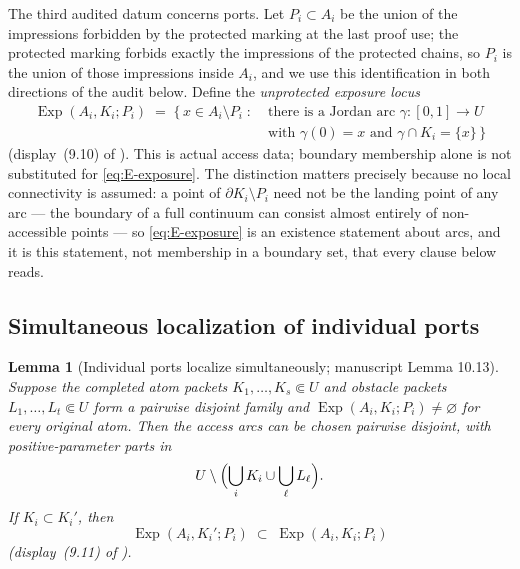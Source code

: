 \documentclass[11pt,reqno]{amsart}
\newtheorem{lemma}[theorem]{Lemma}
\theoremstyle{definition}
\theoremstyle{remark}
\newcommand{\Exp}{\operatorname{Exp}}
\begin{document}
The third audited datum concerns ports. Let $P_i\subset A_i$ be the union of the
impressions forbidden by the protected marking at the last proof use; the protected
marking forbids exactly the impressions of the protected chains, so $P_i$ is the
union of those impressions inside $A_i$, and we use this identification in both
directions of the audit below. Define the
\emph{unprotected exposure locus}
\begin{equation}\label{eq:E-exposure}
\begin{aligned}
\Exp(A_i,K_i;P_i)\;=\;
\bigl\{\,x\in A_i\setminus P_i \;:\;{}&
\text{there is a Jordan arc }\gamma\colon[0,1]\to U\\
&\text{with }\gamma(0)=x
\text{ and }\gamma\cap K_i=\{x\}\,\bigr\}
\end{aligned}
\end{equation}
(display~(9.10) of \cite{MWman}). This is actual access data; boundary membership
alone is not substituted for \eqref{eq:E-exposure}. The distinction matters
precisely because no local connectivity is assumed: a point of
$\partial K_i\setminus P_i$ need not be the landing point of any arc --- the
boundary of a full continuum can consist almost entirely of non-accessible points
\cite{Pom92} --- so \eqref{eq:E-exposure} is an existence statement about arcs, and
it is this statement, not membership in a boundary set, that every clause below
reads.

\subsection{Simultaneous localization of individual ports}\label{subsec:E-localization}

\begin{lemma}[Individual ports localize simultaneously; manuscript Lemma
10.13]\label{lem:port-localization}
Suppose the completed atom packets $K_1,\dots,K_s\Subset U$ and obstacle packets
$L_1,\dots,L_t\Subset U$ form a pairwise disjoint family and
$\Exp(A_i,K_i;P_i)\neq\varnothing$ for every original atom. Then the access arcs can
be chosen pairwise disjoint, with positive-parameter parts in
\[
U\setminus\Bigl(\bigcup_{i}K_i\cup\bigcup_{\ell}L_\ell\Bigr).
\]
If $K_i\subset K_i'$, then
\begin{equation}\label{eq:E-exposure-monotone}
\Exp(A_i,K_i';P_i)\;\subset\;\Exp(A_i,K_i;P_i)
\end{equation}
(display~(9.11) of \cite{MWman}).
\end{lemma}
\end{document}
